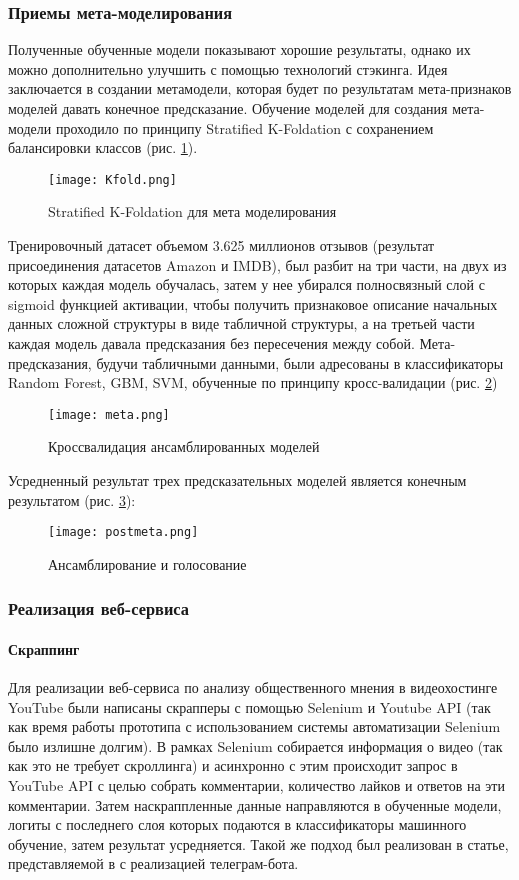 \subsubsection{Приемы мета-моделирования}
Полученные обученные модели показывают хорошие результаты, однако их можно дополнительно улучшить с помощью технологий стэкинга. Идея заключается в создании метамодели, которая будет по результатам мета-признаков моделей давать конечное предсказание. Обучение моделей для создания мета-модели проходило по принципу Stratified K-Foldation с сохранением балансировки классов (рис. \ref{fig:kfold}).  
\begin{figure}[H]
    \centering
    \texttt{[image: Kfold.png]}
    \caption{Stratified K-Foldation для мета моделирования}
    \label{fig:kfold}
\end{figure}
Тренировочный датасет объемом 3.625 миллионов отзывов (результат присоединения датасетов Amazon и IMDB), был разбит на три части, на двух из которых каждая модель обучалась, затем у нее убирался полносвязный слой с sigmoid функцией активации, чтобы получить признаковое описание начальных данных сложной структуры в виде табличной структуры, а на третьей части каждая модель давала предсказания без пересечения между собой. Мета-предсказания, будучи табличными данными, были 
адресованы в классификаторы Random Forest, GBM, SVM, обученные по принципу кросс-валидации (рис. \ref{fig:crossval})
\begin{figure}[H]
    \centering
    \texttt{[image: meta.png]}
    \caption{Кроссвалидация ансамблированных моделей}
    \label{fig:crossval}
\end{figure}
Усредненный результат трех предсказательных моделей является конечным результатом (рис. \ref{fig:postmeta}):
\begin{figure}[H]
    \centering
    \texttt{[image: postmeta.png]}
    \caption{Ансамблирование и голосование}
    \label{fig:postmeta}
\end{figure}
\subsubsection{Реализация веб-сервиса}
\paragraph{Скраппинг}
\par
Для реализации веб-сервиса по анализу общественного мнения в видеохостинге YouTube были написаны скрапперы с помощью Selenium и Youtube API (так как время работы прототипа с использованием системы автоматизации Selenium было излишне долгим). В рамках Selenium собирается информация о видео (так как это не требует скроллинга) и асинхронно с этим происходит запрос в YouTube API с целью собрать комментарии, количество лайков и ответов на эти комментарии. Затем наскраппленные данные направляются в обученные модели, логиты с последнего слоя которых подаются в классификаторы машинного обучение, затем результат усредняется. Такой же подход был реализован в статье, представляемой в \cite{gagar} с реализацией телеграм-бота. 
